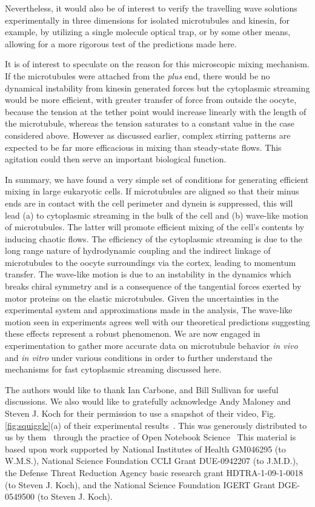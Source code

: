 \documentclass[11pt]{ucthesis}
\begin{document}
Nevertheless, it would also be of interest to verify the travelling wave solutions experimentally
in three dimensions for isolated
microtubules and kinesin, for example, by utilizing a single molecule optical trap, or by some other
means, allowing for a more rigorous test of the predictions made here.


It is of interest to speculate on the reason for this microscopic mixing
mechanism.  If the microtubules were attached from the {\em plus} end,
there would be no dynamical instability from kinesin generated forces
but the cytoplasmic streaming would be more efficient, with greater transfer
of force from outside the oocyte, because the tension at the
tether point would increase linearly with the length of the microtubule,
whereas the tension saturates to a constant value in the case considered
above. However as discussed earlier, complex stirring patterns are
expected to be far more efficacious in mixing than steady-state flows.
This agitation could then serve an important biological function.


In summary, we have found a very simple set of conditions for generating efficient mixing
in large eukaryotic cells. If microtubules are aligned so that their minus ends
are in contact with the cell perimeter and dynein is suppressed, this will lead 
(a) to cytoplasmic streaming in the bulk of the cell and (b) wave-like motion of
microtubules. The latter will promote efficient mixing of the cell's contents by
inducing chaotic flows.
The efficiency of the cytoplasmic streaming is due to the long range nature of
hydrodynamic coupling and the indirect linkage of microtubules to the oocyte surroundings via the cortex, leading to momentum transfer.
The wave-like motion is due to an instability in the dynamics which breaks chiral
symmetry and is a consequence of the tangential forces exerted by motor proteins on the elastic
microtubules. Given the uncertainties in the experimental system and approximations
made in the analysis, The wave-like motion seen in experiments agrees well with our theoretical predictions
suggesting these effects represent a robust phenomenon.
We are now engaged in experimentation to gather more accurate data on microtubule behavior 
{\em in vivo} and {\em in vitro} under various conditions in order to further understand
the mechanisms for fast cytoplasmic streaming discussed here.

The authors would like to thank Ian Carbone, and Bill Sullivan for useful discussions.
We also would like to gratefully acknowledge Andy Maloney and Steven J. Koch for their permission
to use a snapshot of their video, Fig.  \ref{fig:squiggle}(a) \cite{MaloneyKochVideo} of their
experimental results~\cite{MaloneyHerskowitzKoch}. This was generously distributed to us
by them~\cite{KochLab} through the practice of Open Notebook Science~\cite{OpenNotebookScience} 
This material is based upon work supported by National Institutes of Health GM046295 (to W.M.S.), National Science Foundation
CCLI Grant DUE-0942207 (to J.M.D.),
the  Defense Threat Reduction Agency basic research grant HDTRA-1-09-1-0018 (to Steven J. Koch),
and the National Science Foundation IGERT Grant DGE-0549500 (to Steven J. Koch).
\end{document}
